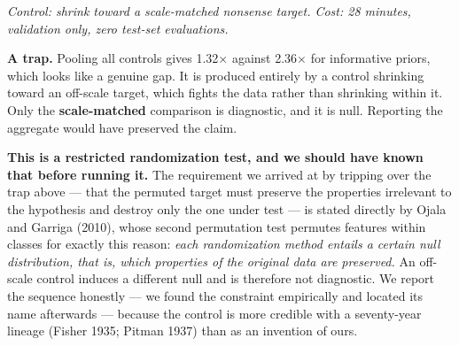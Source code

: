 \emph{Control: shrink toward a scale-matched nonsense target. Cost: 28 minutes, validation only,
zero test-set evaluations.}

\textbf{A trap.} Pooling all controls gives 1.32$\times$ against 2.36$\times$ for informative priors, which looks
like a genuine gap. It is produced entirely by a control shrinking toward an off-scale target,
which fights the data rather than shrinking within it. Only the \textbf{scale-matched} comparison is
diagnostic, and it is null. Reporting the aggregate would have preserved the claim.

\textbf{This is a restricted randomization test, and we should have known that before running it.}
The requirement we arrived at by tripping over the trap above --- that the permuted target must
preserve the properties irrelevant to the hypothesis and destroy only the one under test --- is
stated directly by Ojala and Garriga (2010), whose second permutation test permutes features
within classes for exactly this reason: \emph{each randomization method entails a certain null
distribution, that is, which properties of the original data are preserved.} An off-scale
control induces a different null and is therefore not diagnostic. We report the sequence
honestly --- we found the constraint empirically and located its name afterwards --- because the
control is more credible with a seventy-year lineage (Fisher 1935; Pitman 1937) than as an
invention of ours.
